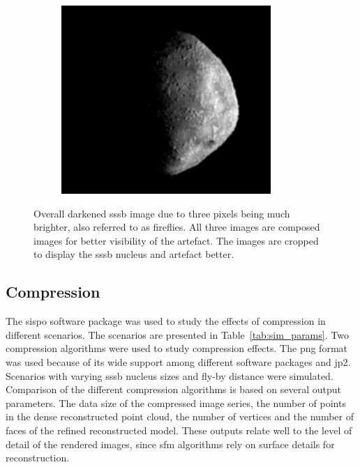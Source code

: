 \begin{figure}[htb]
\begin{subfigure}[b]{0.32\textwidth}
            \label{fig:render_dark_2}
        \end{subfigure}
        \begin{subfigure}[b]{0.32\textwidth}
            \centering
            \includegraphics[width=\textwidth]{doc/thesis/0_figures/composition_darkening/Inst_2017-08-15T115819-007000_center.png}
            \label{fig:render_dark_3}
        \end{subfigure}
    \caption{Overall darkened \gls{sssb} image due to three pixels being much brighter, also referred to as fireflies. All three images are composed images for better visibility of the artefact. The images are cropped to display the \gls{sssb} nucleus and artefact better.}
    \label{fig:render_dark}
\end{figure}

\clearpage

\subsection{Compression} \label{sec:results_comp}
The \gls{sispo} software package was used to study the effects of compression in different scenarios. The scenarios are presented in Table~\ref{tab:sim_params}. Two compression algorithms were used to study compression effects. The \gls{png} format was used because of its wide support among different software packages and \gls{jp2}. Scenarios with varying \gls{sssb} nucleus sizes and fly-by distance were simulated. 
Comparison of the different compression algorithms is based on several output parameters. The data size of the compressed image series, the number of points in the dense reconstructed point cloud, the number of vertices and the number of faces of the refined reconstructed model. These outputs relate well to the level of detail of the rendered images, since \gls{sfm} algorithms rely on surface details for reconstruction.

